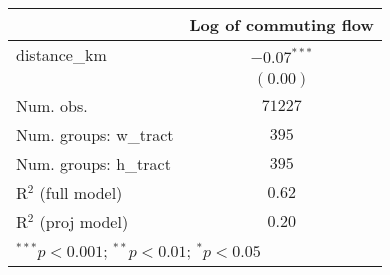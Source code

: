 
\begin{tabular}{l c}
\hline
 & Log of commuting flow \\
\hline
distance\_km          & $-0.07^{***}$ \\
                      & $(0.00)$      \\
\hline
Num. obs.             & $71227$       \\
Num. groups: w\_tract & $395$         \\
Num. groups: h\_tract & $395$         \\
R$^2$ (full model)    & $0.62$        \\
R$^2$ (proj model)    & $0.20$        \\
\hline
\multicolumn{2}{l}{\scriptsize{$^{***}p<0.001$; $^{**}p<0.01$; $^{*}p<0.05$}}
\end{tabular}
